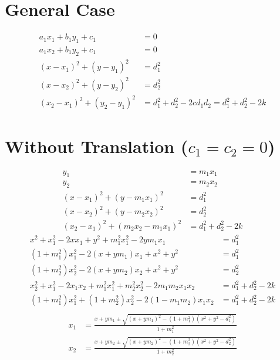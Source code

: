 \documentclass{article}
\begin{document}
\section{General Case}
\begin{align*}
  a_1 x_1 + b_1 y_1 + c_1 & = 0\\
  a_1 x_2 + b_1 y_2 + c_1 & = 0\\
  (x - x_1)^2 + (y - y_1)^2 & = d_1^2\\
  (x - x_2)^2 + (y - y_2)^2 & = d_2^2\\
  (x_2 - x_1)^2 + (y_2 - y_1)^2 & = d_1^2 + d_2^2 - 2 c d_1 d_2 = d_1^2 + d_2^2 - 2 k
\end{align*}
\section{Without Translation ($c_1 = c_2 = 0$)}
\begin{align*}
  y_1 & = m_1 x_1\\
  y_2 & = m_2 x_2\\
  (x - x_1)^2 + (y - m_1 x_1)^2 & = d_1^2\\
  (x - x_2)^2 + (y - m_2 x_2)^2 & = d_2^2\\
  (x_2 - x_1)^2 + (m_2 x_2 - m_1 x_1)^2 & = d_1^2 + d_2^2 - 2 k
\end{align*}
\begin{align*}
  x^2 + x_1^2 - 2 x x_1 + y^2 + m_1^2x_1^2 - 2 y m_1 x_1 &= d_1^2\\
  (1 + m_1^2) x_1^2 - 2 (x + y m_1) x_1  + x^2 + y^2  &= d_1^2\\
  (1 + m_2^2) x_2^2 - 2 (x + y m_2) x_2  + x^2 + y^2  &= d_2^2\\
  x_2^2 + x_1^2 - 2 x_1 x_2 + m_1^2 x_1^2 + m_2^2 x_2^2 - 2 m_1 m_2 x_1 x_2 &= d_1^2 + d_2^2 - 2 k\\
  (1 + m_1^2) x_1^2 + (1 + m_2^2) x_2^2 - 2 (1 - m_1 m_2) x_1 x_2 &= d_1^2 + d_2^2 - 2 k\\
\end{align*}
\begin{align*}
  x_1 &= \frac{x + y m_1 \pm \sqrt{(x + y m_1)^2 - (1 + m_1^2)(x^2 + y^2 - d_1^2)}}{1 + m_1^2}\\
  x_2 &= \frac{x + y m_2 \pm \sqrt{(x + y m_2)^2 - (1 + m_2^2)(x^2 + y^2 - d_2^2)}}{1 + m_2^2}\\
\end{align*}
\end{document}
